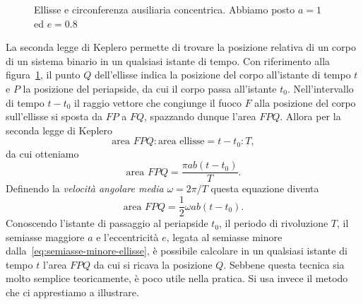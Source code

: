 \begin{figure}
  \centering
  \caption[Ellisse e circonferenza ausiliaria per l'equazione di
  Keplero]{Ellisse e circonferenza ausiliaria concentrica. Abbiamo posto $a=1$
    ed $e=0.8$}
  \label{fig:circonferenza-ausiliaria-keplero}
\end{figure}
La seconda legge di Keplero permette di trovare la posizione relativa di un
corpo di un sistema binario in un qualsiasi istante di tempo. Con riferimento
alla figura~\ref{fig:circonferenza-ausiliaria-keplero}, il punto $Q$
dell'ellisse indica la posizione del corpo all'istante di tempo $t$ e $P$ la
posizione del periapside, da cui il corpo passa all'istante
$t_0$. Nell'intervallo di tempo $t-t_0$ il raggio vettore che congiunge il fuoco
$F$ alla posizione del corpo sull'ellisse si sposta da $FP$ a $FQ$, spazzando
dunque l'area $FPQ$. Allora per la seconda legge di Keplero
\begin{equation}
  \text{area } FPQ : \text{area ellisse} = t-t_0 : T,
\end{equation}
da cui otteniamo
\begin{equation}
  \text{area } FPQ = \frac{\pi ab(t-t_0)}{T}.
\end{equation}
Definendo la \emph{velocità angolare media} $\omega = 2\pi/T$ questa equazione
diventa
\begin{equation}
  \text{area } FPQ = \frac{1}{2}\omega ab(t-t_0).
\end{equation}
Conoscendo l'istante di passaggio al periapside $t_0$, il periodo di rivoluzione
$T$, il semiasse maggiore $a$ e l'eccentricità $e$, legata al semiasse minore
dalla~\eqref{eq:semiasse-minore-ellisse}, è possibile calcolare in un qualsiasi
istante di tempo $t$ l'area $FPQ$ da cui si ricava la posizione $Q$. Sebbene
questa tecnica sia molto semplice teoricamente, è poco utile nella pratica. Si
usa invece il metodo che ci apprestiamo a illustrare.


